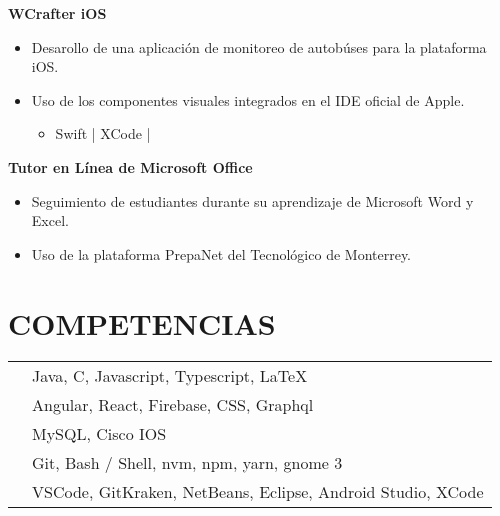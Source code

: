\documentclass{res}
\begin{document}
\begin{resume}
    \textbf{WCrafter iOS} 
    \begin{itemize}
        \item Desarollo de una aplicación de monitoreo de autobúses para la plataforma iOS.
        \item Uso de los componentes visuales integrados en el IDE oficial de Apple.
        \begin{itemize}
            \item Swift | XCode |
        \end{itemize}
    \end{itemize}

    \textbf{Tutor en Línea de Microsoft Office} 
    \begin{itemize}
        \item Seguimiento de estudiantes durante su aprendizaje de Microsoft Word y Excel.
        \item Uso de la plataforma PrepaNet del Tecnológico de Monterrey.
    \end{itemize}

    \section{\large{COMPETENCIAS}} 
    \begin{tabularx}{15cm}{SB}
         &
        Java, C, Javascript, Typescript, LaTeX
        \\
         &
        Angular, React, Firebase, CSS, Graphql
        \\
         &
        MySQL, Cisco IOS
        \\
         &
        Git, Bash / Shell, nvm, npm, yarn, gnome 3
        \\
         &
        VSCode, GitKraken, NetBeans, Eclipse, Android Studio, XCode
    \end{tabularx}
\end{resume}
\end{document}
